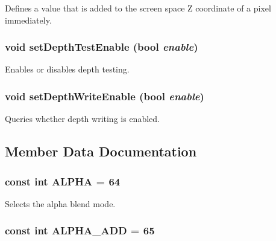 Defines a value that is added to the screen space Z coordinate of a pixel immediately. \hypertarget{classm3g_1_1CompositingMode_5f1afccdc51665bb04c971579d8ee05c}{
\subsubsection[{setDepthTestEnable}]{\setlength{\rightskip}{0pt plus 5cm}void setDepthTestEnable (bool {\em enable})}}
\label{classm3g_1_1CompositingMode_5f1afccdc51665bb04c971579d8ee05c}


Enables or disables depth testing. \hypertarget{classm3g_1_1CompositingMode_a3275c9589ef319c6ba6f5c22d0b2860}{
\subsubsection[{setDepthWriteEnable}]{\setlength{\rightskip}{0pt plus 5cm}void setDepthWriteEnable (bool {\em enable})}}
\label{classm3g_1_1CompositingMode_a3275c9589ef319c6ba6f5c22d0b2860}


Queries whether depth writing is enabled. 

\subsection{Member Data Documentation}
\hypertarget{classm3g_1_1CompositingMode_417581fcde4067111f47320edb2aa378}{
\subsubsection[{ALPHA}]{\setlength{\rightskip}{0pt plus 5cm}const int {\bf ALPHA} = 64}}
\label{classm3g_1_1CompositingMode_417581fcde4067111f47320edb2aa378}


Selects the alpha blend mode. \hypertarget{classm3g_1_1CompositingMode_91ac80a5450e5f7f7e382860829030d9}{
\subsubsection[{ALPHA\_\-ADD}]{\setlength{\rightskip}{0pt plus 5cm}const int {\bf ALPHA\_\-ADD} = 65}}
\label{classm3g_1_1CompositingMode_91ac80a5450e5f7f7e382860829030d9}


